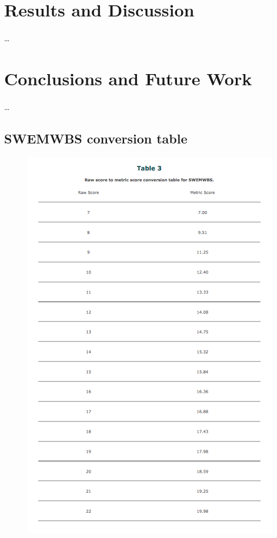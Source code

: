 \documentclass[11pt,openright,a4paper]{report}
\begin{document}
\chapter{Results and Discussion}
\ldots


\chapter{Conclusions and Future Work}
\ldots

\printbibliography

\begin{appendices}
\section{SWEMWBS conversion table} \label{SWEMWBS conversion table}
\begin{figure}[ht]
  \centering
  \includegraphics[width =.7\textwidth]{i/swemwbsconversiontable1.png}
  \label{swemwbsconversiontable}
\end{figure}


\end{appendices}
\end{document}
